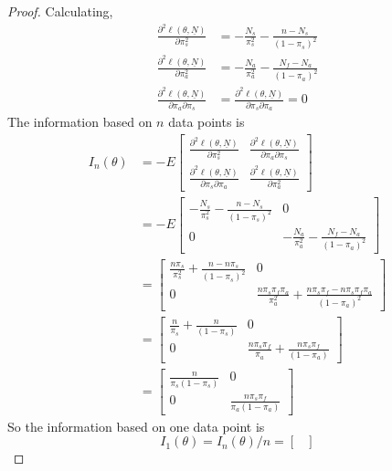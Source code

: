 \documentclass[letterpaper, 12pt]{article}
\begin{document}
\begin{enumerate}[(i)]
\begin{proof}
Calculating,
\begin{align*}
\frac{\partial^2 \ell(\theta, \underline{N})}{\partial \pi_s^2}
&=
-\frac{N_s}{\pi_s^2} - \frac{n - N_s}{(1-\pi_s)^2}
\\
\frac{\partial^2 \ell(\theta, \underline{N})}{\partial \pi_a^2}
&=
-\frac{N_a}{\pi_a^2} - \frac{N_f - N_a}{(1-\pi_a)^2}
\\
\frac{\partial^2 \ell(\theta, \underline{N})}{\partial \pi_a \partial \pi_s} &=\frac{\partial^2 \ell(\theta, \underline{N})}{\partial \pi_s \partial \pi_a}  = 0
\end{align*}
The information based on $n$ data points is
\begin{align*}
I_n(\theta) 
&=
-
E
\begin{bmatrix}
\frac{\partial^2 \ell(\theta, \underline{N})}{\partial \pi_s^2}
&
\frac{\partial^2 \ell(\theta, \underline{N})}{\partial \pi_a \partial \pi_s}
\\
\frac{\partial^2 \ell(\theta, \underline{N})}{\partial \pi_s \partial \pi_a}
&
\frac{\partial^2 \ell(\theta, \underline{N})}{\partial \pi_a^2}
\end{bmatrix}
\\
&=
-E
\begin{bmatrix}
-\frac{N_s}{\pi_s^2} - \frac{n - N_s}{(1-\pi_s)^2}
&
0
\\
0
&
-\frac{N_a}{\pi_a^2} - \frac{N_f - N_a}{(1-\pi_a)^2}
\end{bmatrix}
\\
&=
\begin{bmatrix}
\frac{n\pi_s}{\pi_s^2} + \frac{n - n\pi_s}{(1-\pi_s)^2}
&
0
\\
0
&
\frac{n \pi_s\pi_f\pi_a}{\pi_a^2} + \frac{n\pi_s\pi_f - n \pi_s\pi_f\pi_a}{(1-\pi_a)^2}
\end{bmatrix}
\\
&
=
\begin{bmatrix}
\frac{n}{\pi_s} + \frac{n}{(1-\pi_s)}
&
0
\\
0
&
\frac{n \pi_s\pi_f}{\pi_a} + \frac{n\pi_s\pi_f}{(1-\pi_a)}
\end{bmatrix}
\\
&=
\begin{bmatrix}
\frac{n}{\pi_s(1-\pi_s)}
&
0
\\
0
&
\frac{n \pi_s\pi_f}{\pi_a(1-\pi_a)}
\end{bmatrix}
\end{align*}
So the information based on one data point is
\[
I_1(\theta)
=
I_n(\theta)/n
=
\begin{bmatrix}

\end{bmatrix}\]
\end{proof}
\end{enumerate}
\end{document}

